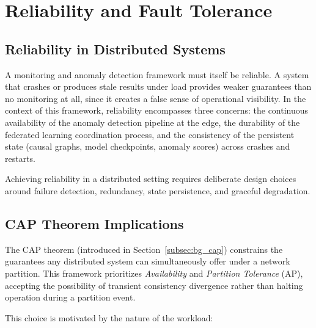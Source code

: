 \chapter{Reliability and Fault Tolerance}
\label{ch:reliability}

\section{Reliability in Distributed Systems}
\label{sec:reliability_overview}

A monitoring and anomaly detection framework must itself be reliable. A system that
crashes or produces stale results under load provides weaker guarantees than no
monitoring at all, since it creates a false sense of operational visibility. In the
context of this framework, reliability encompasses three concerns: the continuous
availability of the anomaly detection pipeline at the edge, the durability of the
federated learning coordination process, and the consistency of the persistent state
(causal graphs, model checkpoints, anomaly scores) across crashes and restarts.

Achieving reliability in a distributed setting requires deliberate design choices
around failure detection, redundancy, state persistence, and graceful degradation.

\section{CAP Theorem Implications}
\label{sec:reliability_cap}

The CAP theorem (introduced in Section~\ref{subsec:bg_cap}) constrains the guarantees
any distributed system can simultaneously offer under a network partition. This
framework prioritizes \emph{Availability} and \emph{Partition Tolerance} (AP),
accepting the possibility of transient consistency divergence rather than halting
operation during a partition event.

This choice is motivated by the nature of the workload:


